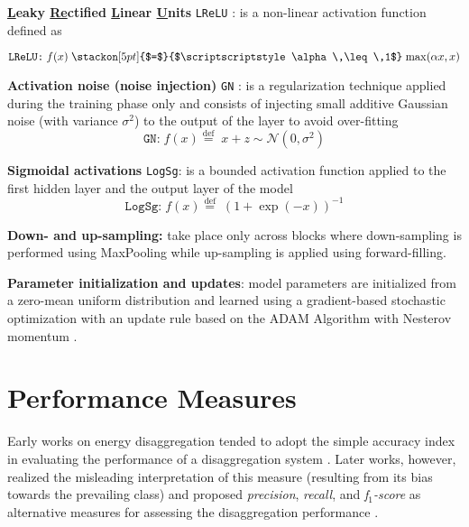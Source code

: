 \documentclass[twocolumn,letter,10pt]{IEEEtran} %
\begin{document}
\textbf{\underline{L}eaky \underline{Re}ctified \underline{L}inear \underline{U}nits} \texttt{LReLU} \cite{Maas_2013_RectifierNonLinearities}: is a non-linear activation function defined as

{\small\begin{equation*}
	\texttt{LReLU:}\; f(x) \mathrel{\stackon[5pt]{$=$}{$\scriptscriptstyle\alpha \,\leq\,1$}} \max(\alpha x, x)
	\end{equation*}}%


\textbf{Activation noise (noise injection)} \texttt{GN} \cite{Nair_2010_ReLU_RBM}: is a regularization technique applied during the training phase only and consists of injecting small additive Gaussian noise (with variance $\sigma^2$) to the output of the layer to avoid over-fitting
\begin{equation*}
\texttt{GN:}\; f(x) \stackrel{\text{def}}{=}\; x + z \sim \mathcal{N}(0, \sigma^2)
\end{equation*}

\textbf{Sigmoidal activations} \texttt{LogSg}: is a bounded activation function applied to the first hidden layer and the output layer of the model
\begin{equation}
\texttt{LogSg:}\; f(x) \stackrel{\text{def}}{=}\; (1+\exp(-x))^{-1}
\label{eq:logsg-activation}
\end{equation}

\textbf{Down- and up-sampling:} take place only across blocks where down-sampling is performed using MaxPooling while up-sampling is applied using forward-filling.

\textbf{Parameter initialization and updates}: model parameters are initialized from a zero-mean uniform distribution \cite{Glorot_2010} and learned using a gradient-based stochastic  optimization \cite{Bottou_2012_StochasticGradientDescent} with an update rule based on the ADAM Algorithm \cite{Kingma_2014_ADAM} with Nesterov momentum \cite{Dozat_2015_NADAM}.

\section{Performance Measures}
\label{sec:performance-measures}

Early works on energy disaggregation tended to adopt the simple accuracy index in evaluating the performance of a disaggregation system \cite{Chang_2010, Belkin_2013, Makonin_2013_AMPds1}. Later works, however, realized the misleading interpretation of this measure (resulting from its bias towards the prevailing class) and proposed \emph{precision}, \emph{recall}, and \emph{f$_1$-score} as alternative measures for assessing the disaggregation performance \cite{Beckel_2014_ECO, Holmegaard_2016_IndustrialSettings, Kim_2010, Makonin_2015_NILMPerformanceEvaluation}.
\end{document}
